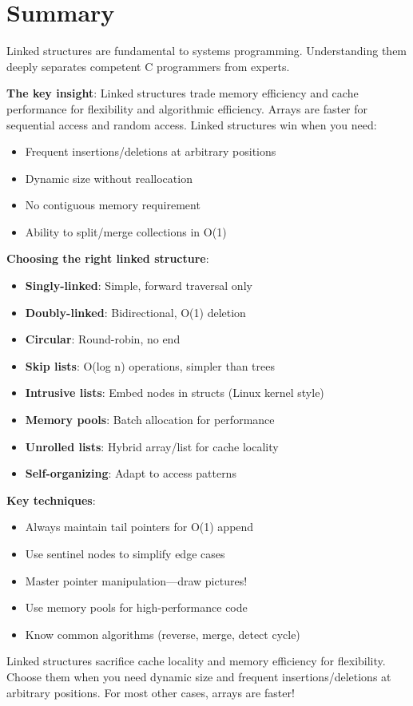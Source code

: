 \section{Summary}

Linked structures are fundamental to systems programming. Understanding them deeply separates competent C programmers from experts.

\textbf{The key insight}: Linked structures trade memory efficiency and cache performance for flexibility and algorithmic efficiency. Arrays are faster for sequential access and random access. Linked structures win when you need:
\begin{itemize}
    \item Frequent insertions/deletions at arbitrary positions
    \item Dynamic size without reallocation
    \item No contiguous memory requirement
    \item Ability to split/merge collections in O(1)
\end{itemize}

\textbf{Choosing the right linked structure}:

\begin{itemize}
    \item \textbf{Singly-linked}: Simple, forward traversal only
    \item \textbf{Doubly-linked}: Bidirectional, O(1) deletion
    \item \textbf{Circular}: Round-robin, no end
    \item \textbf{Skip lists}: O(log n) operations, simpler than trees
    \item \textbf{Intrusive lists}: Embed nodes in structs (Linux kernel style)
    \item \textbf{Memory pools}: Batch allocation for performance
    \item \textbf{Unrolled lists}: Hybrid array/list for cache locality
    \item \textbf{Self-organizing}: Adapt to access patterns
\end{itemize}

\textbf{Key techniques}:

\begin{itemize}
    \item Always maintain tail pointers for O(1) append
    \item Use sentinel nodes to simplify edge cases
    \item Master pointer manipulation---draw pictures!
    \item Use memory pools for high-performance code
    \item Know common algorithms (reverse, merge, detect cycle)
\end{itemize}

Linked structures sacrifice cache locality and memory efficiency for flexibility. Choose them when you need dynamic size and frequent insertions/deletions at arbitrary positions. For most other cases, arrays are faster!
